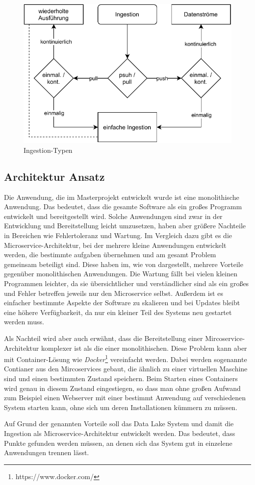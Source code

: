 \begin{figure}
    \centering
    \includegraphics{Grafiken/ingestion-types.pdf}
    \caption{Ingestion-Typen}
    \label{fig:ingestion_types}
\end{figure}

\subsection{Architektur Ansatz}
Die Anwendung, die im Masterprojekt entwickelt wurde ist eine monolithische Anwendung.
Das bedeutet, dass die gesamte Software als ein großes Programm entwickelt und bereitgestellt wird.
Solche Anwendungen sind zwar in der Entwicklung und Bereitstellung leicht umzusetzen, haben aber größere Nachteile in Bereichen wie Fehlertoleranz und Wartung.
Im Vergleich dazu gibt es die Microservice-Architektur, bei der mehrere kleine Anwendungen entwickelt werden, die bestimmte aufgaben übernehmen und am gesamt Problem gemeinsam beteiligt sind.
Diese haben im, wie von \textcite{microservices} dargestellt, mehrere Vorteile gegenüber monolithischen Anwendungen.
Die Wartung fällt bei vielen kleinen Programmen leichter, da sie übersichtlicher und verständlicher sind als ein großes und Fehler betreffen jeweils nur den Microservice selbst.
Außerdem ist es einfacher bestimmte Aspekte der Software zu skalieren und bei Updates bleibt eine höhere Verfügbarkeit, da nur ein kleiner Teil des Systems neu gestartet werden muss.

Als Nachteil wird aber auch erwähnt, dass die Bereitstellung einer Mircoservice-Architektur komplexer ist als die einer monolithischen.
Diese Problem kann aber mit Container-Lösung wie \textit{Docker}\footnote{https://www.docker.com/} vereinfacht werden.
Dabei werden sogenannte Contianer aus den Mircoservices gebaut, die ähnlich zu einer virtuellen Maschine sind und einen bestimmten Zustand speichern.
Beim Starten eines Containers wird genau in diesem Zustand eingestiegen, so dass man ohne großen Aufwand zum Beispiel einen Webserver mit einer bestimmt Anwendung auf verschiedenen System starten kann, ohne sich um deren Installationen kümmern zu müssen.

Auf Grund der genannten Vorteile soll das Data Lake System und damit die Ingestion als Microservice-Architektur entwickelt werden.
Das bedeutet, dass Punkte gefunden werden müssen, an denen sich das System gut in einzelene Anwendungen trennen lässt.